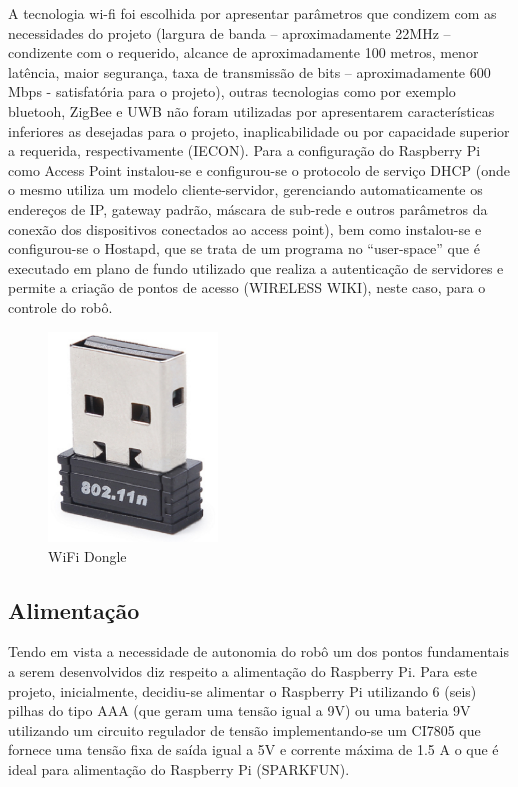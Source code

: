 A tecnologia wi-fi foi escolhida por apresentar parâmetros que condizem com as necessidades do projeto (largura de banda – aproximadamente 22MHz – condizente com o requerido, alcance de aproximadamente 100 metros, menor latência, maior segurança, taxa de transmissão de bits – aproximadamente 600 Mbps - satisfatória para o projeto), outras tecnologias como por exemplo bluetooh, ZigBee e UWB não foram utilizadas por apresentarem características inferiores as desejadas para o projeto, inaplicabilidade ou por capacidade superior a requerida, respectivamente (IECON). Para a configuração do Raspberry Pi como Access Point instalou-se e configurou-se o protocolo de serviço DHCP (onde o mesmo utiliza um modelo cliente-servidor, gerenciando automaticamente os endereços de IP, gateway padrão, máscara de sub-rede e outros parâmetros da conexão dos dispositivos conectados ao access point), bem como instalou-se e configurou-se o Hostapd, que se trata de um programa no “user-space” que é executado em plano de fundo utilizado que realiza a autenticação de servidores e permite a criação de pontos de acesso (WIRELESS WIKI), neste caso, para o controle do robô. 

\begin{figure}[H]
    \centering
    \includegraphics[width=0.4\textwidth]{figuras/adaptador_wifi.eps}
    \caption{ WiFi Dongle}
    \label{fig:catia01}
\end{figure}

\subsection{Alimentação}

Tendo em vista a necessidade de autonomia do robô um dos pontos fundamentais a serem desenvolvidos diz respeito a alimentação do Raspberry Pi. Para este projeto, inicialmente, decidiu-se alimentar o Raspberry Pi utilizando 6 (seis) pilhas do tipo AAA (que geram uma tensão igual a 9V) ou uma bateria 9V utilizando um circuito regulador de tensão implementando-se um CI7805 que fornece uma tensão fixa de saída igual a 5V e corrente máxima de 1.5 A o que é ideal para alimentação do Raspberry Pi (SPARKFUN).


